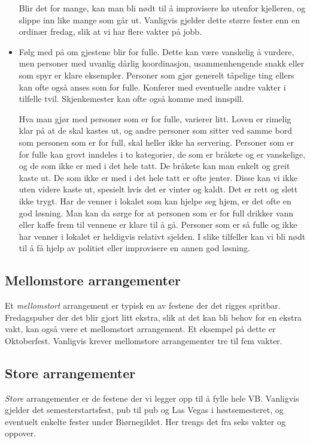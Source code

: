 \documentclass[11pt,norsk,a4paper]{article}
\begin{document}
\begin{itemize}
Blir det for mange, kan man bli nødt til å improvisere kø utenfor kjelleren, og slippe inn like mange som går ut. Vanligvis gjelder dette større fester enn en ordinær fredag, slik at vi har flere vakter på jobb.
\item Følg med på om gjestene blir for fulle. Dette kan være vanskelig å vurdere, men personer med uvanlig dårlig koordinasjon, usammenhengende snakk eller som spyr er klare eksempler. Personer som gjør generelt tåpelige ting ellers kan ofte også anses som for fulle. Konferer med eventuelle andre vakter i tilfelle tvil. Skjenkemester kan ofte også komme med innspill.

Hva man gjør med personer som er for fulle, varierer litt. Loven er rimelig klar på at de skal kastes ut, og andre personer som sitter ved samme bord som personen som er for full, skal heller ikke ha servering. Personer som er for fulle kan grovt inndeles i to kategorier, de som er bråkete og er vanskelige, og de som ikke er med i det hele tatt. De bråkete kan man enkelt og greit kaste ut. De som ikke er med i det hele tatt er ofte jenter. Disse kan vi ikke uten videre kaste ut, spesielt hvis det er vinter og kaldt. Det er rett og slett ikke trygt. Har de venner i lokalet som kan hjelpe seg hjem, er det ofte en god løsning. Man kan da sørge for at personen som er for full drikker vann eller kaffe frem til vennene er klare til å gå. Personer som er så fulle og ikke har venner i lokalet er heldigvis relativt sjelden. I slike tilfeller kan vi bli nødt til å få hjelp av politiet eller improvisere en annen god løsning.
\end{itemize}



\subsection{Mellomstore arrangementer}

Et \textit{mellomstort} arrangement er typisk en av festene der det rigges spritbar. Fredagspuber der det blir gjort litt ekstra, slik at det kan bli behov for en ekstra vakt, kan også være et mellomstort arrangement. Et eksempel på dette er Oktoberfest. Vanligvis krever mellomstore arrangementer tre til fem vakter.

\subsection{Store arrangementer}

\textit{Store} arrangementer er de festene der vi legger opp til å fylle hele VB. Vanligvis gjelder det semesterstartsfest, pub til pub og Las Vegas i høstsemesteret, og eventuelt enkelte fester under Biørnegildet. Her trengs det fra seks vakter og oppover.
\end{document}
